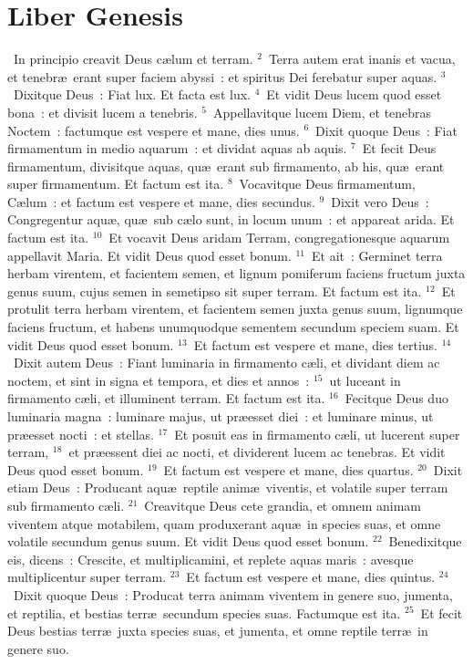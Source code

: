 {\centering \section*{Liber Genesis}}\thispagestyle{empty}

~In principio creavit Deus c\ae lum et terram.
${}^{2}$~Terra autem erat inanis et vacua, et tenebr\ae\ erant super faciem abyssi~: et spiritus Dei ferebatur super aquas.
${}^{3}$~Dixitque Deus~: Fiat lux. Et facta est lux.
${}^{4}$~Et vidit Deus lucem quod esset bona~: et divisit lucem a tenebris.
${}^{5}$~Appellavitque lucem Diem, et tenebras Noctem~: factumque est vespere et mane, dies unus.
${}^{6}$~Dixit quoque Deus~: Fiat firmamentum in medio aquarum~: et dividat aquas ab aquis.
${}^{7}$~Et fecit Deus firmamentum, divisitque aquas, qu\ae\ erant sub firmamento, ab his, qu\ae\ erant super firmamentum. Et factum est ita.
${}^{8}$~Vocavitque Deus firmamentum, C\ae lum~: et factum est vespere et mane, dies secundus.
${}^{9}$~Dixit vero Deus~: Congregentur aqu\ae , qu\ae\ sub c\ae lo sunt, in locum unum~: et appareat arida. Et factum est ita.
${}^{10}$~Et vocavit Deus aridam Terram, congregationesque aquarum appellavit Maria. Et vidit Deus quod esset bonum.
${}^{11}$~Et ait~: Germinet terra herbam virentem, et facientem semen, et lignum pomiferum faciens fructum juxta genus suum, cujus semen in semetipso sit super terram. Et factum est ita.
${}^{12}$~Et protulit terra herbam virentem, et facientem semen juxta genus suum, lignumque faciens fructum, et habens unumquodque sementem secundum speciem suam. Et vidit Deus quod esset bonum.
${}^{13}$~Et factum est vespere et mane, dies tertius.
${}^{14}$~Dixit autem Deus~: Fiant luminaria in firmamento c\ae li, et dividant diem ac noctem, et sint in signa et tempora, et dies et annos~:
${}^{15}$~ut luceant in firmamento c\ae li, et illuminent terram. Et factum est ita.
${}^{16}$~Fecitque Deus duo luminaria magna~: luminare majus, ut pr\ae esset diei~: et luminare minus, ut pr\ae esset nocti~: et stellas.
${}^{17}$~Et posuit eas in firmamento c\ae li, ut lucerent super terram,
${}^{18}$~et pr\ae essent diei ac nocti, et dividerent lucem ac tenebras. Et vidit Deus quod esset bonum.
${}^{19}$~Et factum est vespere et mane, dies quartus.
${}^{20}$~Dixit etiam Deus~: Producant aqu\ae\ reptile anim\ae\ viventis, et volatile super terram sub firmamento c\ae li.
${}^{21}$~Creavitque Deus cete grandia, et omnem animam viventem atque motabilem, quam produxerant aqu\ae\ in species suas, et omne volatile secundum genus suum. Et vidit Deus quod esset bonum.
${}^{22}$~Benedixitque eis, dicens~: Crescite, et multiplicamini, et replete aquas maris~: avesque multiplicentur super terram.
${}^{23}$~Et factum est vespere et mane, dies quintus.
${}^{24}$~Dixit quoque Deus~: Producat terra animam viventem in genere suo, jumenta, et reptilia, et bestias terr\ae\ secundum species suas. Factumque est ita.
${}^{25}$~Et fecit Deus bestias terr\ae\ juxta species suas, et jumenta, et omne reptile terr\ae\ in genere suo.

